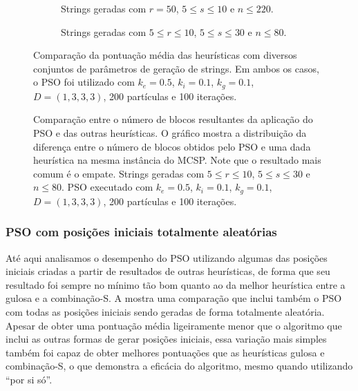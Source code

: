     \begin{figure}[htb]
        \centering
        \begin{subfigure}[b]{\textwidth}
            \centering
            \caption{Strings geradas com $r = 50$, $5 \leq s \leq 10$ e $n \leq 220$.}
            \vspace{12pt}
        \end{subfigure}
        \begin{subfigure}[b]{\textwidth}
            \centering
            \caption{Strings geradas com $5 \leq r \leq 10$, $5 \leq s \leq 30$ e $n \leq 80$.}
            \vspace{12pt}
        \end{subfigure}
        \caption{Comparação da pontuação média das heurísticas com diversos conjuntos de parâmetros de geração de strings. Em ambos os casos, o PSO foi utilizado com $k_e = 0.5$, $k_i = 0.1$, $k_g = 0.1$, $D = (1, 3, 3, 3)$, 200 partículas e 100 iterações.}
        \label{fig:comparacao-pontuacao}
    \end{figure}

    \begin{figure}[htb]
        \centering
        \caption{Comparação entre o número de blocos resultantes da aplicação do PSO e das outras heurísticas. O gráfico mostra a distribuição da diferença entre o número de blocos obtidos pelo PSO e uma dada heurística na mesma instância do MCSP. Note que o resultado mais comum é o empate. Strings geradas com $5 \leq r \leq 10$, $5 \leq s \leq 30$ e $n \leq 80$. PSO executado com $k_e = 0.5$, $k_i = 0.1$, $k_g = 0.1$, $D = (1, 3, 3, 3)$, 200 partículas e 100 iterações.}
        \label{fig:pso-diff}
    \end{figure}

    \subsubsection{PSO com posições iniciais totalmente aleatórias}

        Até aqui analisamos o desempenho do PSO utilizando algumas das posições iniciais criadas a partir de resultados de outras heurísticas, de forma que seu resultado foi sempre no mínimo tão bom quanto ao da melhor heurística entre a gulosa e a combinação-S. A  mostra uma comparação que inclui também o PSO com todas as posições iniciais sendo geradas de forma totalmente aleatória. Apesar de obter uma pontuação média ligeiramente menor que o algoritmo que inclui as outras formas de gerar posições iniciais, essa variação mais simples também foi capaz de obter melhores pontuações que as heurísticas gulosa e combinação-S, o que demonstra a eficácia do algoritmo, mesmo quando utilizando ``por si só''.


